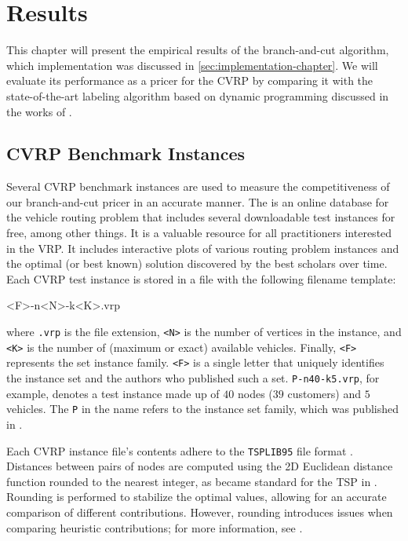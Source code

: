 \chapter{Results}
\label{sec:results}

This chapter will present the empirical results of the branch-and-cut algorithm, which implementation was discussed in \cref{sec:implementation-chapter}.
We will evaluate its performance as a pricer for the CVRP by comparing it with the state-of-the-art labeling algorithm based on dynamic programming discussed in the works of \textcite{pessoa2020generic, sadykov2021bucket}.

\medskip

\section{CVRP Benchmark Instances}
\label{sec:results-benchmark-instances}

Several CVRP benchmark instances are used to measure the competitiveness
of our branch-and-cut pricer in an accurate manner.
The 
is an online database for the vehicle routing problem that includes
several downloadable test instances for free, among other things.
It is a valuable resource for all practitioners interested in the VRP.
It includes interactive plots of various routing problem instances
and the optimal (or best known) solution discovered by the best scholars over time.
Each CVRP test instance is stored in a file with the following filename template:
\begin{center}
	\begin{LVerbatim}
		<F>-n<N>-k<K>.vrp
	\end{LVerbatim}
\end{center}
where \texttt{.vrp} is the file extension,
\texttt{<N>} is the number of vertices in the instance, and
\texttt{<K>} is the number of (maximum or exact) available vehicles.
Finally, \texttt{<F>} represents the set instance family.
\texttt{<F>} is a single letter that uniquely identifies the instance
set and the authors who published such a set.
\texttt{P-n40-k5.vrp}, for example, denotes a test instance made up
of $40$ nodes ($39$ customers) and $5$ vehicles.
The \texttt{P} in the name refers to the instance set family,
which was published in \textcite{augerat1995}.

Each CVRP instance file's contents adhere
to the \texttt{TSPLIB95} file format \parencite{reinelt1995}.
Distances between pairs of nodes are computed
using the 2D Euclidean distance function rounded to the nearest integer,
as became standard for the TSP in \textcite{reinelt1991}.
Rounding is performed to stabilize the optimal values,
allowing for an accurate comparison of different contributions.
However, rounding introduces issues when comparing heuristic contributions;
for more information, see \textcite{uchoa2017}.

